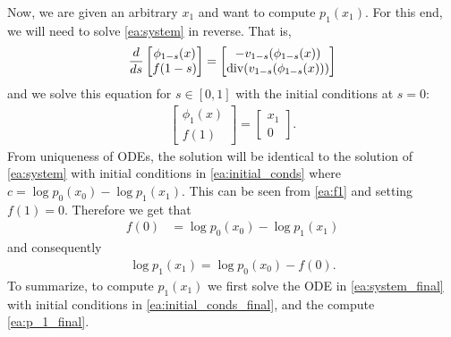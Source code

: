 \documentclass{article}
\begin{document}
Now, we are given an arbitrary $x_1$ and want to compute $p_1(x_1)$. For this end, we will need to solve \eqref{ea:system} in reverse. That is,
\begin{align}\label{ea:system_final}
    \frac{d}{ds}\begin{bmatrix}
    \phi_{1-s}(x) \\
    f(1-s) 
    \end{bmatrix}=
    \begin{bmatrix}
    -v_{1-s}(\phi_{1-s}(x)) \\ 
    \mathrm{div} (v_{1-s}(\phi_{1-s}(x)))
    \end{bmatrix}
\end{align}
and we solve this equation for $s\in [0,1]$ with the initial conditions at $s=0$:
\begin{align}\label{ea:initial_conds_final}
    \begin{bmatrix}
    \phi_1(x) \\ 
    f(1)
    \end{bmatrix} = \begin{bmatrix}
    x_1 \\ 0
    \end{bmatrix}.
\end{align}
From uniqueness of ODEs, the solution will be identical to the solution of \eqref{ea:system} with initial conditions in \eqref{ea:initial_conds} where $c=\log p_0(x_0)-\log p_1(x_1)$. This can be seen from \eqref{ea:f1} and setting $f(1)=0$. Therefore we get that 
\begin{align*}
    f(0) &= \log p_0(x_0)-\log p_1(x_1)
\end{align*}
and consequently 
\begin{align}\label{ea:p_1_final}
    \log p_1(x_1) = \log p_0(x_0) - f(0).
\end{align}
To summarize, to compute $p_1(x_1)$ we first solve the ODE in \eqref{ea:system_final} with initial conditions in \eqref{ea:initial_conds_final}, and the compute \eqref{ea:p_1_final}. 
\end{document}
